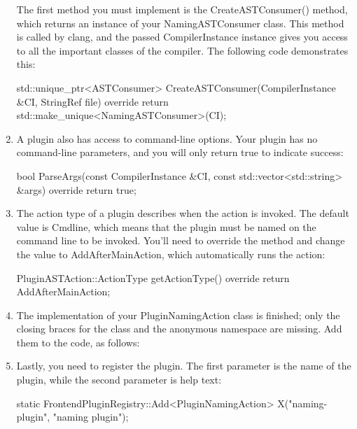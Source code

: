 \begin{enumerate}
The first method you must implement is the CreateASTConsumer() method, which returns an instance of your NamingASTConsumer class. This method is called by clang, and the passed CompilerInstance instance gives you access to all the important classes of the compiler. The following code demonstrates this:

\begin{cpp}
    std::unique_ptr<ASTConsumer>
    CreateASTConsumer(CompilerInstance &CI,
                      StringRef file) override {
        return std::make_unique<NamingASTConsumer>(CI);
    }
\end{cpp}

\item
A plugin also has access to command-line options. Your plugin has no command-line parameters, and you will only return true to indicate success:

\begin{cpp}
    bool ParseArgs(const CompilerInstance &CI,
                   const std::vector<std::string> &args)
                                                  override {
        return true;
    }
\end{cpp}

\item
The action type of a plugin describes when the action is invoked. The default value is Cmdline, which means that the plugin must be named on the command line to be invoked. You’ll need to override the method and change the value to AddAfterMainAction, which automatically runs the action:

\begin{cpp}
    PluginASTAction::ActionType getActionType() override {
        return AddAfterMainAction;
    }
\end{cpp}

\item
The implementation of your PluginNamingAction class is finished; only the closing braces for the class and the anonymous namespace are missing. Add them to the code, as follows:

\begin{cpp}
};
}
\end{cpp}

\item
Lastly, you need to register the plugin. The first parameter is the name of the plugin, while the second parameter is help text:

\begin{cpp}
static FrontendPluginRegistry::Add<PluginNamingAction> X("naming-plugin",       "naming plugin");
\end{cpp}
\end{enumerate}

